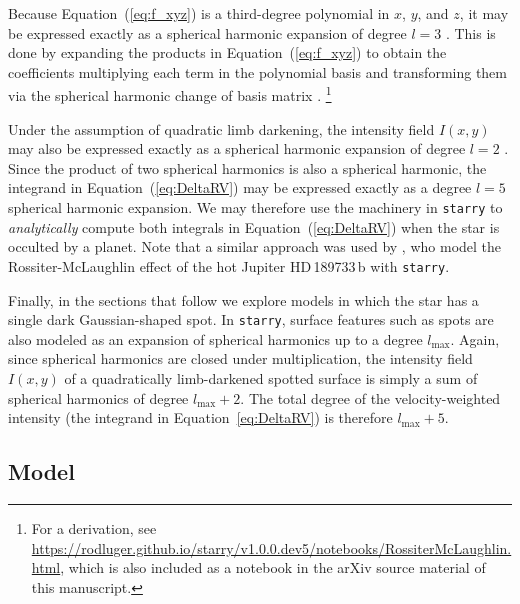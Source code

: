 \documentclass[twocolumn]{aastex63}
\begin{document}
Because Equation~(\ref{eq:f_xyz}) is a third-degree polynomial in $x$, $y$, and $z$, it may be expressed exactly as a spherical harmonic expansion of degree $l=3$ \citep{Luger19}. This is done by expanding the products in Equation~(\ref{eq:f_xyz}) to obtain the coefficients multiplying each term in the polynomial basis \citep[Equation~7 in][]{Luger19} and transforming them via the spherical harmonic change of basis matrix \citep[Equation~9 in][]{Luger19}.%
\footnote{For a derivation, see \url{https://rodluger.github.io/starry/v1.0.0.dev5/notebooks/RossiterMcLaughlin.html}, which is also included as a notebook in the arXiv source material of this manuscript.}%

Under the assumption of quadratic limb darkening, the intensity field $I(x, y)$ may also be expressed exactly as a spherical harmonic expansion of degree $l=2$ \citep{Luger19}. Since the product of two spherical harmonics is also a spherical harmonic, the integrand in Equation~(\ref{eq:DeltaRV}) may be expressed exactly as a degree $l=5$ spherical harmonic expansion. We may therefore use the machinery in \texttt{starry} to \emph{analytically} compute both integrals in Equation~(\ref{eq:DeltaRV}) when the star is occulted by a planet. 
Note that a similar approach was used by \citet{Bedell19}, who model the Rossiter-McLaughlin effect of the hot Jupiter HD\,189733\,b with \texttt{starry}.

Finally, in the sections that follow we explore models in which the star has a single dark Gaussian-shaped spot. In \texttt{starry}, surface features such as spots are also modeled as an expansion of spherical harmonics up to a degree $l_\mathrm{max}$. Again, since spherical harmonics are closed under multiplication, the intensity field $I(x, y)$ of a quadratically limb-darkened spotted surface is simply a sum of spherical harmonics of degree $l_\mathrm{max} + 2$. The total degree of the velocity-weighted intensity (the integrand in Equation~\ref{eq:DeltaRV}) is therefore $l_\mathrm{max} + 5$.

\subsection{Model}
\label{sec:model}
\end{document}
